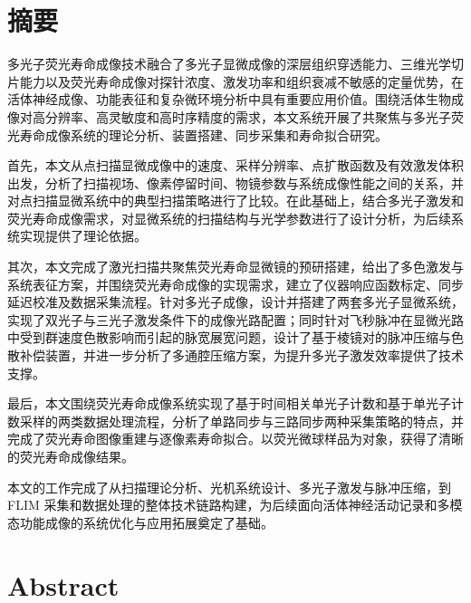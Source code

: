 
\maketitle%
\MAKETITLE%
\makedeclaration%
\intobmk\chapter*{摘\quad 要}%
\setcounter{page}{1}%

多光子荧光寿命成像技术融合了多光子显微成像的深层组织穿透能力、三维光学切片能力以及荧光寿命成像对探针浓度、激发功率和组织衰减不敏感的定量优势，在活体神经成像、功能表征和复杂微环境分析中具有重要应用价值。围绕活体生物成像对高分辨率、高灵敏度和高时序精度的需求，本文系统开展了共聚焦与多光子荧光寿命成像系统的理论分析、装置搭建、同步采集和寿命拟合研究。

首先，本文从点扫描显微成像中的速度、采样分辨率、点扩散函数及有效激发体积出发，分析了扫描视场、像素停留时间、物镜参数与系统成像性能之间的关系，并对点扫描显微系统中的典型扫描策略进行了比较。在此基础上，结合多光子激发和荧光寿命成像需求，对显微系统的扫描结构与光学参数进行了设计分析，为后续系统实现提供了理论依据。

其次，本文完成了激光扫描共聚焦荧光寿命显微镜的预研搭建，给出了多色激发与系统表征方案，并围绕荧光寿命成像的实现需求，建立了仪器响应函数标定、同步延迟校准及数据采集流程。针对多光子成像，设计并搭建了两套多光子显微系统，实现了双光子与三光子激发条件下的成像光路配置；同时针对飞秒脉冲在显微光路中受到群速度色散影响而引起的脉宽展宽问题，设计了基于棱镜对的脉冲压缩与色散补偿装置，并进一步分析了多通腔压缩方案，为提升多光子激发效率提供了技术支撑。

最后，本文围绕荧光寿命成像系统实现了基于时间相关单光子计数和基于单光子计数采样的两类数据处理流程，分析了单路同步与三路同步两种采集策略的特点，并完成了荧光寿命图像重建与逐像素寿命拟合。以荧光微球样品为对象，获得了清晰的荧光寿命成像结果。

本文的工作完成了从扫描理论分析、光机系统设计、多光子激发与脉冲压缩，到 FLIM 采集和数据处理的整体技术链路构建，为后续面向活体神经活动记录和多模态功能成像的系统优化与应用拓展奠定了基础。

\intobmk\chapter*{Abstract}%

